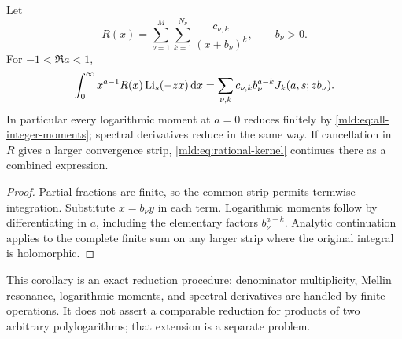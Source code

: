 \begin{corollary}\label{mld:cor:rational-kernel}
Let
\[
 R(x)=\sum_{\nu=1}^{M}\sum_{k=1}^{N_\nu}
                        \frac{c_{\nu,k}}{(x+b_\nu)^k},\qquad b_\nu>0.
\]
For $-1<\Re a<1$,
\begin{equation}\label{mld:eq:rational-kernel}
 \int_0^\infty x^{a-1}R(x)\operatorname{Li}_s(-zx)\,\mathrm{d} x
       =\sum_{\nu,k}c_{\nu,k}b_\nu^{a-k}
                          J_k(a,s;zb_\nu).
\end{equation}
In particular every logarithmic moment at $a=0$ reduces finitely by \eqref{mld:eq:all-integer-moments}; spectral derivatives reduce in the same way. If cancellation in $R$ gives a larger convergence strip, \eqref{mld:eq:rational-kernel} continues there as a combined expression.
\end{corollary}
\begin{proof}
Partial fractions are finite, so the common strip permits termwise integration. Substitute $x=b_\nu y$ in each term. Logarithmic moments follow by differentiating in $a$, including the elementary factors $b_\nu^{a-k}$. Analytic continuation applies to the complete finite sum on any larger strip where the original integral is holomorphic.
\end{proof}

This corollary is an exact reduction procedure: denominator multiplicity, Mellin resonance, logarithmic moments, and spectral derivatives are handled by finite operations. It does not assert a comparable reduction for products of two arbitrary polylogarithms; that extension is a separate problem.
